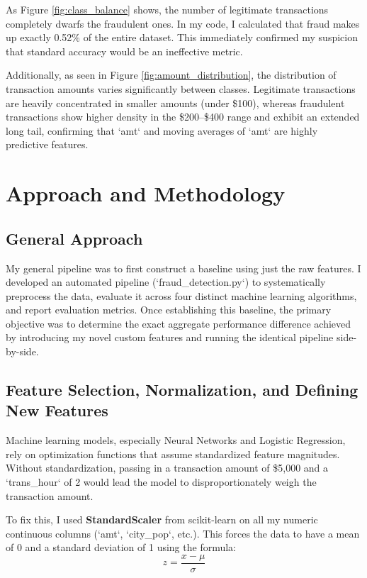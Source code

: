 \documentclass[11pt]{article}
\begin{document}
As Figure \ref{fig:class_balance} shows, the number of legitimate transactions completely dwarfs the fraudulent ones. In my code, I calculated that fraud makes up exactly 0.52\% of the entire dataset. This immediately confirmed my suspicion that standard accuracy would be an ineffective metric. 

Additionally, as seen in Figure \ref{fig:amount_distribution}, the distribution of transaction amounts varies significantly between classes. Legitimate transactions are heavily concentrated in smaller amounts (under \$100), whereas fraudulent transactions show higher density in the \$200--\$400 range and exhibit an extended long tail, confirming that `amt` and moving averages of `amt` are highly predictive features.

\section{Approach and Methodology}

\subsection{General Approach}
My general pipeline was to first construct a baseline using just the raw features. I developed an automated pipeline (`fraud\_detection.py`) to systematically preprocess the data, evaluate it across four distinct machine learning algorithms, and report evaluation metrics. Once establishing this baseline, the primary objective was to determine the exact aggregate performance difference achieved by introducing my novel custom features and running the identical pipeline side-by-side.

\subsection{Feature Selection, Normalization, and Defining New Features}
Machine learning models, especially Neural Networks and Logistic Regression, rely on optimization functions that assume standardized feature magnitudes. Without standardization, passing in a transaction amount of \$5,000 and a `trans\_hour` of 2 would lead the model to disproportionately weigh the transaction amount.

To fix this, I used \textbf{StandardScaler} from scikit-learn on all my numeric continuous columns (`amt`, `city\_pop`, etc.). This forces the data to have a mean of 0 and a standard deviation of 1 using the formula:
\begin{equation}
z = \frac{x - \mu}{\sigma}
\end{equation}
\end{document}
